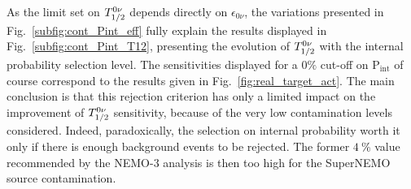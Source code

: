 As the limit set on $T_{1/2}^{0\nu}$ depends directly on $\epsilon_{0\nu}$, the variations presented in Fig.~\ref{subfig:cont_Pint_eff} fully explain the results displayed in Fig.~\ref{subfig:cont_Pint_T12}, presenting the evolution of $T_{1/2}^{0\nu}$ with the internal probability selection level.
The sensitivities displayed for a $0\%$ cut-off on P$_{\text{int}}$ of course correspond to the results given in Fig.~\ref{fig:real_target_act}.
The main conclusion is that this rejection criterion has only a limited impact on the improvement of $T_{1/2}^{0\nu}$ sensitivity, because of the very low contamination levels considered.
Indeed, paradoxically, the selection on internal probability worth it only if there is enough background events to be rejected.
The former $4~\%$ value recommended by the NEMO-$3$ analysis is then too high for the SuperNEMO source contamination.

